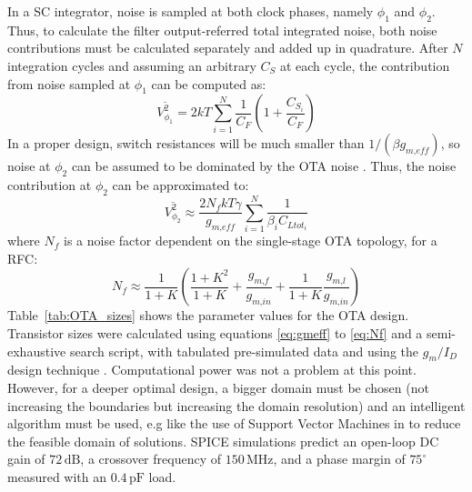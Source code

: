 In a SC integrator, noise is sampled at both clock phases, namely $\phi_1$ and $\phi_2$. Thus, to calculate the filter output-referred total integrated noise, both noise contributions must be calculated separately and added up in quadrature. After $N$ integration cycles and assuming an arbitrary $C_S$ at each cycle, the contribution from noise sampled at $\phi_1$ can be computed as:
\begin{equation}
\overline{V_{\phi_1}^2} = 2 kT \sum_{i=1}^{N} \frac{1}{C_F}\left(1 + \frac{C_{S_i}}{C_F}\right)
\end{equation}
In a proper design, switch resistances will be much smaller than $1/(\beta g_\textit{m,eff})$, so noise at $\phi_2$ can be assumed to be dominated by the OTA noise \citep{vleugels101}. Thus, the noise contribution at $\phi_2$ can be approximated to:
\begin{equation}
\overline{V_{\phi_2}^2} \approx \frac{2 N_f kT\gamma}{g_\textit{m,eff}} \sum_{i=1}^{N} \frac{1}{\beta_i C_{Ltot_i}}
\end{equation}
where $N_f$ is a noise factor dependent on the single-stage OTA topology, for a RFC:
\begin{equation}
N_f \approx \frac1{1+K}\left(\frac{1+K^2}{1+K} + \frac{g_\textit{m,f}}{g_\textit{m,in}} + \frac1{1+K}\frac{g_\textit{m,l}}{g_\textit{m,in}}\right) \label{eq:Nf}
\end{equation}
Table~\ref{tab:OTA_sizes} shows the parameter values for the OTA design. Transistor sizes were calculated using equations \ref{eq:gmeff} to \ref{eq:Nf} and a semi-exhaustive search script, with tabulated pre-simulated data and using the $g_m/I_D$ design technique \citep{silveira101}. Computational power was not a problem at this point. However, for a deeper optimal design, a bigger domain must be chosen (not increasing the boundaries but increasing the domain resolution) and an intelligent algorithm must be used, e.g like the use of Support Vector Machines in \citep{bernardinis101} to reduce the feasible domain of solutions.  SPICE simulations predict an \mbox{open-loop} DC gain of $72\,\text{dB}$, a crossover frequency of $150\,\text{MHz}$, and a phase margin of $75^\circ$ measured with an $0.4\,\text{pF}$ load.


